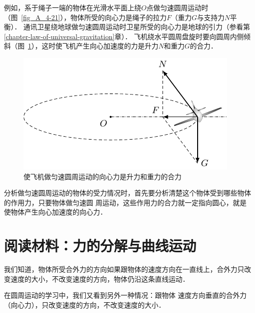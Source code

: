 例如，系于绳子一端的物体在光滑水平面上绕$O$点做匀速圆周运动时（图~\ref{fig_A_4-21}），物体所受的向心力是绳子的拉力$F$（重力$G$与支持力$N$平衡）． 通讯卫星绕地球做匀速圆周运动时卫星所受的向心力是地球的引力（参看第\ref{chapter-law-of-universal-gravitation}章）． 飞机绕水平圆周盘旋时要向圆周内侧倾斜（图~\ref{fig_A_4-22}），这时使飞机产生向心加速度的力是升力$N$和重力$G$的合力．
\begin{figure}[htbp]
    \centering
    \includegraphics{fig/A/4-22.pdf}
    \caption{使飞机做匀速圆周运动的向心力是升力和重力的合力}\label{fig_A_4-22}
\end{figure}

分析做匀速圆周运动的物体的受力情况时，首先要分析清楚这个物体受到哪些物体的作用力，只要物体做匀速圆
周运动，这些作用力的合力就一定指向圆心，就是使物体产生向心加速度的向心力．

\section*{阅读材料：力的分解与曲线运动}
我们知道，物体所受合外力的方向如果跟物体的速度方向在一直线上，合外力只改变速度的大小，不改变速度的方向，物体仍沿这条直线运动．

在圆周运动的学习中，我们又看到另外一种情况：跟物体
速度方向垂直的合外力（向心力），只改变速度的方向，不改变速度的大小．

